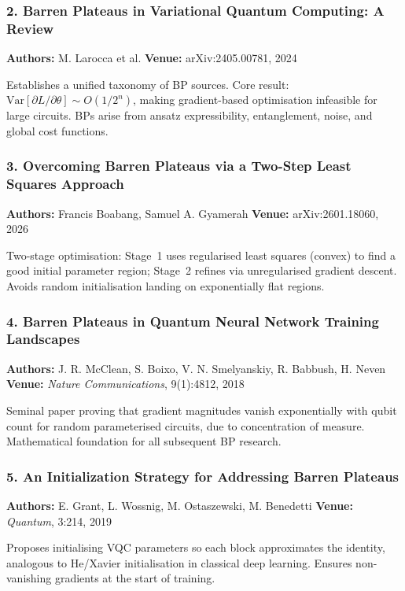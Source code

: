 \documentclass[11pt,a4paper]{article}
\begin{document}
\subsubsection*{2. Barren Plateaus in Variational Quantum Computing: A Review}
\textbf{Authors:} M. Larocca et al. \quad \textbf{Venue:} arXiv:2405.00781, 2024

Establishes a unified taxonomy of BP sources. Core result: $\text{Var}[\partial L/\partial\theta] \sim O(1/2^n)$, making gradient-based optimisation infeasible for large circuits. BPs arise from ansatz expressibility, entanglement, noise, and global cost functions.

\subsubsection*{3. Overcoming Barren Plateaus via a Two-Step Least Squares Approach}
\textbf{Authors:} Francis Boabang, Samuel A. Gyamerah \quad \textbf{Venue:} arXiv:2601.18060, 2026

Two-stage optimisation: Stage~1 uses regularised least squares (convex) to find a good initial parameter region; Stage~2 refines via unregularised gradient descent. Avoids random initialisation landing on exponentially flat regions.

\subsubsection*{4. Barren Plateaus in Quantum Neural Network Training Landscapes}
\textbf{Authors:} J. R. McClean, S. Boixo, V. N. Smelyanskiy, R. Babbush, H. Neven \quad \textbf{Venue:} \emph{Nature Communications}, 9(1):4812, 2018

Seminal paper proving that gradient magnitudes vanish exponentially with qubit count for random parameterised circuits, due to concentration of measure. Mathematical foundation for all subsequent BP research.

\subsubsection*{5. An Initialization Strategy for Addressing Barren Plateaus}
\textbf{Authors:} E. Grant, L. Wossnig, M. Ostaszewski, M. Benedetti \quad \textbf{Venue:} \emph{Quantum}, 3:214, 2019

Proposes initialising VQC parameters so each block approximates the identity, analogous to He/Xavier initialisation in classical deep learning. Ensures non-vanishing gradients at the start of training.
\end{document}
